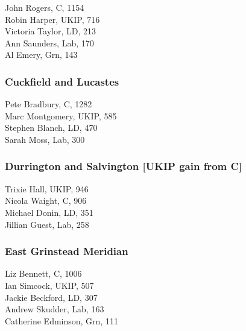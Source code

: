 \documentclass[a4paper,openany,10pt]{book}
\begin{document}


John Rogers, C, 1154\\
Robin Harper, UKIP, 716\\
Victoria Taylor, LD, 213\\
Ann Saunders, Lab, 170\\
Al Emery, Grn, 143\\


\subsubsection*{Cuckfield and Lucastes}



Pete Bradbury, C, 1282\\
Marc Montgomery, UKIP, 585\\
Stephen Blanch, LD, 470\\
Sarah Moss, Lab, 300\\


\subsubsection*{Durrington and Salvington \hspace*{\fill}\nolinebreak[1]%
\enspace\hspace*{\fill}
[UKIP gain from C]}



Trixie Hall, UKIP, 946\\
Nicola Waight, C, 906\\
Michael Donin, LD, 351\\
Jillian Guest, Lab, 258\\


\subsubsection*{East Grinstead Meridian}



Liz Bennett, C, 1006\\
Ian Simcock, UKIP, 507\\
Jackie Beckford, LD, 307\\
Andrew Skudder, Lab, 163\\
Catherine Edminson, Grn, 111\\
\end{document}
